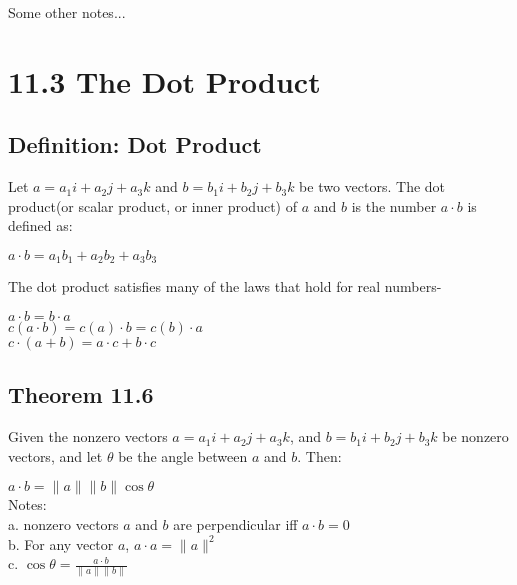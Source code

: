 \documentclass{article} %
\begin{document}
    Some other notes...
    
    \section*{11.3 The Dot Product}
    \subsection*{Definition: Dot Product}
    Let $a = a_1i+a_2j+a_3k$ and $b = b_1i+b_2j+b_3k$ be two vectors. The dot product(or scalar product, or inner product) of $a$ and $b$
    is the number $a \cdot b$ is defined as:
    \begin{center}
        $a \cdot b = a_1b_1+a_2b_2+a_3b_3$
        
    \end{center}
    The dot product satisfies many of the laws that hold for real numbers-\\
    \begin{center}
    
    $a \cdot b = b \cdot a$\\
    $c(a \cdot b) = c(a) \cdot b= c(b) \cdot a$\\
    $c \cdot (a+b)  = a \cdot c + b \cdot c$
    
    
        
    \end{center}
    
    \subsection*{Theorem 11.6}
    Given the nonzero vectors $a = a_1i+a_2j+a_3k$, and $b = b_1i+b_2j+b_3k$ be nonzero vectors, and let $\theta$ be the angle between 
    $a$ and $b$. Then:

    \begin{center}
        $a\cdot b = \|a\| \|b\| \cos \theta$\\
        Notes:\\
        a. nonzero vectors $a$ and $b$ are perpendicular iff $a \cdot b =0$\\
        b. For any vector $a$, $a \cdot a = \|a\|^2$\\
        c. $\cos \theta = \frac{a\cdot b}{\|a\|\|b\|}$
        
    \end{center}
   
    
    
    
    
    
    
    
    
    
    
    
    
    
    
    
    
    
    
\end{document}
